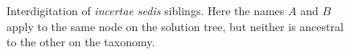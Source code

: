 \documentclass[english]{article}
\begin{document}
\begin{figure}
\hfill{}
\hfill{}
\hfill{}
\caption{\label{fig:interdigitation}Interdigitation of \emph{incertae sedis} siblings.  Here the names $A$ and $B$ apply to the same node on the solution tree, but neither is ancestral to the other on the taxonomy.}
\end{figure}
\end{document}
